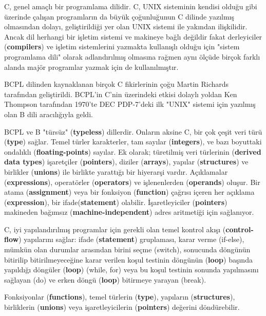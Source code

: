 \documentclass[a4paper,12pt,oneside]{book}
\begin{document}
C, genel amaçlı bir programlama dilidir. C, UNIX sisteminin kendisi olduğu gibi üzerinde çalışan programların da büyük çoğunluğunun C dilinde yazılmış olmasından dolayı, geliştirildiği yer olan UNIX sistemi ile yakından ilişkilidir. Ancak dil herhangi bir işletim sistemi ve makineye bağlı değildir fakat derleyiciler (\textbf{compilers}) ve işletim sistemlerini yazmakta kullanışlı olduğu için "sistem programlama dili" olarak adlandırılmış olmasına rağmen aynı ölçüde birçok farklı alanda majör programlar yazmak için de kullanılmıştır.
\par BCPL dilinden kaynaklanan birçok C fikirlerinin çoğu Martin Richards tarafından geliştirildi. BCPL'in C'nin üzerindeki etkisi dolaylı yoldan Ken Thompson tarafından 1970'te DEC PDP-7'deki ilk "UNIX" sistemi için yazılmış olan B dili aracılığıyla geldi.
\par BCPL ve B "türsüz" (\textbf{typeless}) dillerdir. Onların aksine C, bir çok çeşit veri türü (\textbf{type}) sağlar. Temel türler karakterler, tam sayılar (\textbf{integers}), ve bazı boyuttaki ondalıklı (\textbf{floating-points}) sayılar. Ek olarak; türetilmiş veri türlerinin (\textbf{derived data types}) işaretçiler (\textbf{pointers}), diziler (\textbf{arrays}), yapılar (\textbf{structures}) ve birlikler (\textbf{unions}) ile birlikte yarattığı bir hiyerarşi vardır. Açıklamalar (\textbf{expressions}), operatörler (\textbf{operators}) ve işlenenlerden (\textbf{operands}) oluşur. Bir atama (\textbf{assignment}) veya bir fonksiyon (\textbf{function}) çağrısı içeren her açıklama (\textbf{expression}), bir ifade(\textbf{statement}) olabilir. İşaretleyiciler (\textbf{pointers}) makineden bağımsız (\textbf{machine-independent}) adres aritmetiği için sağlanıyor.
\par C, iyi yapılandırılmış programlar için gerekli olan temel kontrol akışı (\textbf{control-flow}) yapılarını sağlar: ifade (\textbf{statement}) gruplaması, karar verme (if-else), mümkün olan durumlar arasından birini seçme (switch), sonucunda döngünün bitirilip bitirilmeyeceğine karar verilen koşul testinin döngünün (\textbf{loop}) başında yapıldığı döngüler (\textbf{loop}) (while, for) veya bu koşul testinin sonunda yapılmasını sağlayan (do) ve erken döngü (\textbf{loop}) bitirmeye yarayan (break).
\par Fonksiyonlar (\textbf{functions}), temel türlerin (\textbf{type}), yapıların (\textbf{structures}), birliklerin (\textbf{unions}) veya işaretleyicilerin (\textbf{pointers}) değerini döndürebilir. \pagebreak
\end{document}
